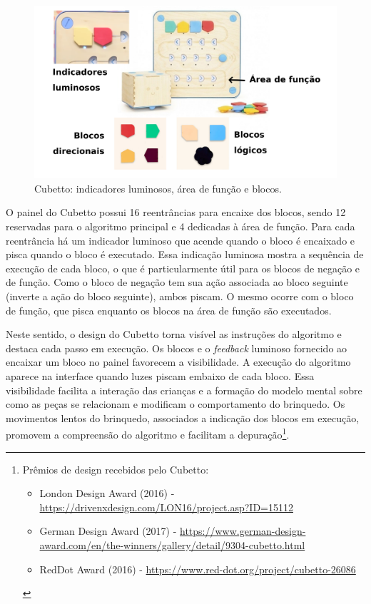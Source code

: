 \begin{figure}
    \centering
    \includegraphics[width=.7\linewidth,fbox]{figs/cubetto_blocks.png}
    \caption{Cubetto: indicadores luminosos, área de função e blocos.}
    \label{fig:cubetto_features}
\end{figure}

O painel do Cubetto possui 16 reentrâncias para encaixe dos blocos, sendo 12 reservadas para o algoritmo principal e 4 dedicadas à área de função. Para cada reentrância há um indicador luminoso que acende quando o bloco é encaixado e pisca quando o bloco é executado. Essa indicação luminosa mostra a sequência de execução de cada bloco, o que é particularmente útil para os blocos de negação e de função. Como o bloco de negação tem sua ação associada ao bloco seguinte (inverte a ação do bloco seguinte), ambos piscam. O mesmo ocorre com o bloco de função, que pisca enquanto os blocos na área de função são executados.

Neste sentido, o design do Cubetto torna visível as instruções do algoritmo e destaca cada passo em execução. Os blocos e o \textit{feedback} luminoso fornecido ao encaixar um bloco no painel favorecem a visibilidade. A execução do algoritmo aparece na interface quando luzes piscam embaixo de cada bloco. Essa visibilidade facilita a interação das crianças e a formação do modelo mental sobre como as peças se relacionam e modificam o comportamento do brinquedo. Os movimentos lentos do brinquedo, associados a indicação dos blocos em execução, promovem a compreensão do algoritmo e facilitam a depuração\footnote{
Prêmios de design recebidos pelo Cubetto:
\begin{itemize}
    \item London Design Award (2016) - \url{https://drivenxdesign.com/LON16/project.asp?ID=15112}
    \item German Design Award (2017) - \url{https://www.german-design-award.com/en/the-winners/gallery/detail/9304-cubetto.html}
    \item RedDot Award (2016) - \url{https://www.red-dot.org/project/cubetto-26086}
\end{itemize}
}.

